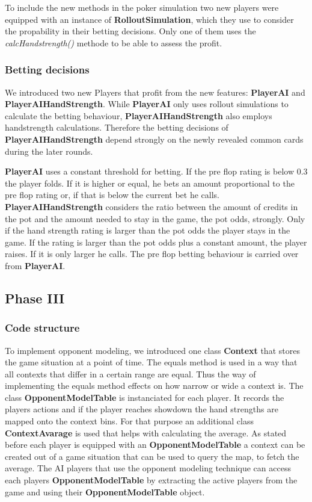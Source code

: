 To include the new methods in the poker simulation two new players were equipped with an instance of
\textbf{RolloutSimulation}, which they use to consider the propability in their betting decisions. Only one of them uses
the \textit{calcHandstrength()} methode to be able to assess the profit.


\subsubsection{Betting decisions}

We introduced two new Players that profit from the new features: \textbf{PlayerAI} and \textbf{PlayerAIHandStrength}.
While \textbf{PlayerAI} only uses rollout simulations to calculate the betting behaviour, \textbf{PlayerAIHandStrength}
also employs handstrength calculations. Therefore the betting decisions of \textbf{PlayerAIHandStrength} depend strongly
on the newly revealed common cards during the later rounds.

\textbf{PlayerAI} uses a constant threshold for betting. If the pre flop rating is below 0.3 the player folds. If it is
higher or equal, he bets an amount proportional to the pre flop rating or, if that is below the current bet he calls.
\textbf{PlayerAIHandStrength} considers the ratio between the amount of credits in the pot and the amount needed to stay
in the game, the pot odds, strongly. Only if the hand strength rating is larger than the pot odds the player stays in
the game. If the rating is larger than the pot odds plus a constant amount, the player raises. If it is only larger he
calls. The pre flop betting behaviour is carried over from \textbf{PlayerAI}.

\subsection{Phase III}

\subsubsection{Code structure}

To implement opponent modeling, we introduced one class \textbf{Context} that stores the game situation at a point of
time. The equals method is used in a way that all contexts that differ in a certain range are equal. Thus the way of
implementing the equals method effects on how narrow or wide a context is.
The class \textbf{OpponentModelTable} is instanciated for each player. It records the players actions and if the player
reaches showdown the hand strengths are mapped onto the context bins. For that purpose an additional class
\textbf{ContextAvarage} is used that helps with calculating the average.
As stated before each player is equipped with an \textbf{OpponentModelTable} a context can be created out of a game situation
that can be used to query the map, to fetch the average.
The AI players that use the opponent modeling technique can access each players \textbf{OpponentModelTable} by
extracting the active players from the game and using their \textbf{OpponentModelTable} object.

